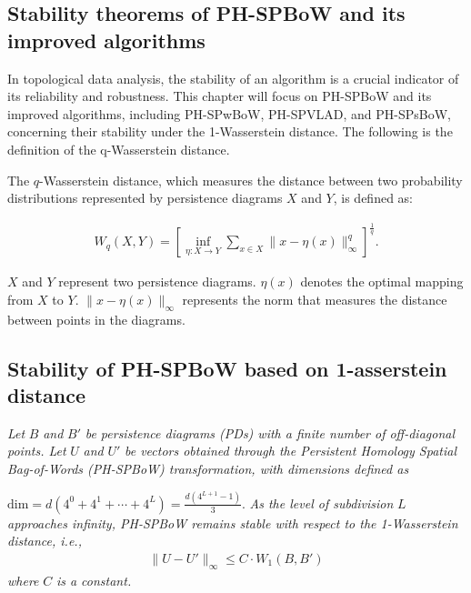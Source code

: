\documentclass[5GeSdc,ASOC,numref,printGA,printHL,CASflow,nocrossmark,longtitle,PROOF]{/usr/local/texlive/iTemplates/01-Templates/01-Els-Jnl/01-Standard_Templates/V1/ELS_MDL5-V1-6}
\begin{document}
\begin{articlestyle}
\section{Stability theorems of PH-SPBoW and its improved algorithms}\label{sec4}

In topological data analysis, the stability of an algorithm is a crucial indicator of its reliability and robustness. This chapter will focus on PH-SPBoW and its improved algorithms, including PH-SPwBoW, PH-SPVLAD, and PH-SPsBoW, concerning their stability under the 1-Wasserstein distance. The following is the definition of the q-Wasserstein distance.

The $ q $-Wasserstein distance, which measures the distance between two probability distributions represented by persistence diagrams $ X $ and $ Y $, is defined as:  
\begin{definition}\label{definition5}
	\begin{align*}  
	W_q(X, Y) = {\left[\inf_{\eta: X \to Y} \sum_{x \in X} \| x - \eta(x) \|_\infty^q \right]}^{\frac{1}{q}}.  
	\end{align*}  
	  
	$ X $ and $ Y $ represent two persistence diagrams.  
	$ \eta(x) $ denotes the optimal mapping from $ X $ to $ Y $.  
	$ \| x - \eta(x) \|_\infty $ represents the norm that measures the distance between points in the diagrams.  
\end{definition}


\subsection{Stability of PH-SPBoW based on 1-asserstein distance}\label{sec4.1}

\begin{theorem}\label{thm1}  
	\textit{Let} $ B $ \textit{and} $ B' $ \textit{be persistence diagrams (PDs) with a finite number of off-diagonal points. Let} $ U $ \textit{and} $ U' $ \textit{be vectors obtained through the Persistent Homology Spatial Bag-of-Words (PH-SPBoW) transformation, with dimensions defined as}   
	
	$  
	\text{dim} = d(4^0 + 4^1 + \cdots + 4^L) = \frac{d(4^{L+1} - 1)}{3}.  
	$  
	\textit{As the level of subdivision} $ L $ \textit{approaches infinity, PH-SPBoW remains stable with respect to the 1-Wasserstein distance, i.e.,}   
	\begin{align*}  
	\| U - U' \|_\infty \leq C \cdot W_1(B, B')  
	\end{align*}  
	\textit{where} $ C $ \textit{is a constant.}    
\end{theorem}  


\end{articlestyle}
\end{document}
